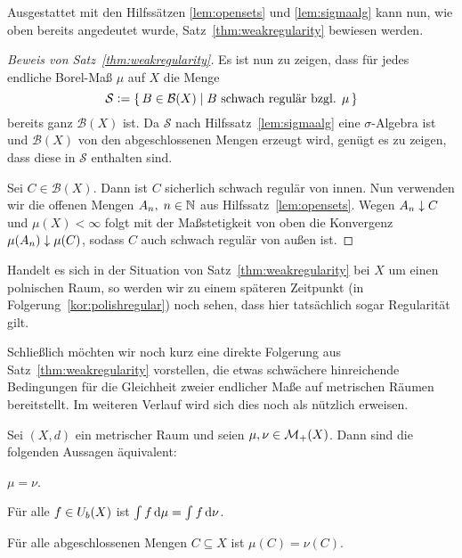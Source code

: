 \documentclass[../main/main.tex]{subfiles}
\begin{document}
	Ausgestattet mit den Hilfssätzen \ref{lem:opensets} und \ref{lem:sigmaalg} kann nun, 
	wie oben bereits angedeutet wurde, Satz~\ref{thm:weakregularity} bewiesen werden.
	
	\begin{proof}[Beweis von Satz~\ref{thm:weakregularity}]
		Es ist nun zu zeigen, dass für jedes endliche Borel-Maß $\mu$ auf $X$
		die Menge 
		$$\mathcal{S} \vcentcolon = \left\{\, B \in \mathcal{B}(X) \; \middle| \; B \text{ schwach regulär bzgl. } \mu \,\right\}$$
		bereits ganz $\mathcal{B}(X)$ ist. 
		Da $\mathcal{S}$ nach Hilfssatz~\ref{lem:sigmaalg} eine 
		$\sigma$-Algebra ist und 
		$\mathcal{B}(X)$ von den abgeschlossenen Mengen erzeugt wird, genügt es zu zeigen, 
		dass diese in $\mathcal{S}$ enthalten sind. 
		
		Sei $C \in \mathcal{B}(X)$. Dann ist $C$ sicherlich schwach regulär von innen. 
		Nun verwenden wir die offenen Mengen $A_n, \; n \in \mathbb{N}$ aus 
		Hilfssatz~\ref{lem:opensets}. 
		Wegen $A_n \downarrow C$ und $\mu(X) < \infty$ folgt mit der 
		Maßstetigkeit von oben die Konvergenz $\mu(A_n) \downarrow \mu(C)$,
		sodass $C$ auch schwach regulär von außen ist.
	\end{proof}

	\begin{Bemerkung}
		Handelt es sich in der Situation von Satz~\ref{thm:weakregularity} bei $X$ um einen polnischen Raum, 
		so werden wir zu einem späteren Zeitpunkt (in Folgerung~\ref{kor:polishregular}) noch sehen, dass hier tatsächlich sogar Regularität gilt.
	\end{Bemerkung}
	
	Schließlich möchten wir noch kurz eine direkte Folgerung aus Satz~\ref{thm:weakregularity} vorstellen, die etwas 
	schwächere hinreichende Bedingungen für die Gleichheit 
	zweier endlicher Maße auf metrischen Räumen bereitstellt. Im weiteren Verlauf 
	wird sich dies noch als nützlich erweisen.
	
	\begin{Satz}
		\label{thm:measureequality}
		Sei $(X,d)$ ein metrischer Raum und seien $\mu, \nu \in \mathcal{M}_{+}(X)$. 
		Dann sind die folgenden Aussagen äquivalent:
		\begin{equivalentthm}
			\item $\mu = \nu$.
			\item Für alle $f \in U_b(X)$ ist
			$\int_{} \, f \, \mathrm{d}\mu = \int_{} \, f \, \mathrm{d}\nu$.
			\item Für alle abgeschlossenen Mengen $C \subseteq X$ ist $\mu(C) = \nu(C)$.
		\end{equivalentthm}
	\end{Satz}
	
\end{document}
